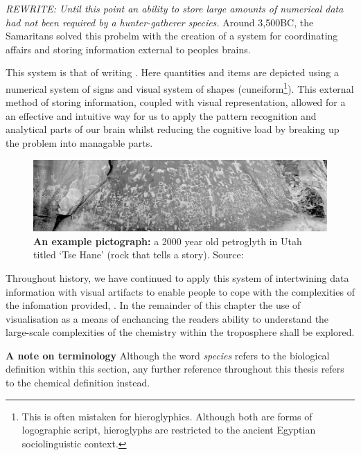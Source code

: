  \emph{REWRITE:
 Until this point an ability to store large amounts of numerical data had not been required by a hunter-gatherer species.} Around 3,500BC, the Samaritans solved this probelm with the creation of a system for coordinating affairs and storing information external to peoples brains. 

This system is that of writing \citep{archaic,beforeCuneiform}. Here quantities and items are depicted using a numerical system of signs and visual system of shapes (cuneiform\footnote{This is often mistaken for hieroglyphics. Although both are forms of logographic script, hieroglyphs are restricted to the ancient Egyptian sociolinguistic context. }). This external method of storing information, coupled with visual representation, allowed for a an effective and intuitive way for us to apply the pattern recognition and analytical parts of our brain whilst reducing the cognitive load by breaking up the problem into managable parts. 


\begin{figure}[H]
         \centering
         \includegraphics[width=\textwidth]{figures_c1/newspaperrock.jpg}
        \caption{\textbf{An example pictograph:} a 2000 year old petroglyth in Utah titled `Tse Hane' (rock that tells a story). Source:
        \citep{newspaperrock} }
        \label{cave}
\end{figure}

Throughout history, we have continued to apply this system of intertwining data information with visual artifacts to enable people to cope with the complexities of the infomation provided, \citep{tufte}. In the remainder of this chapter the use of visualisation as a means of enchancing the readers ability to understand the large-scale complexities of the chemistry within the troposphere shall be explored. 


\textbf{A note on terminology}
Although the word \emph{species} refers to the biological definition within this section, any further reference throughout this thesis refers to the chemical definition instead. 





